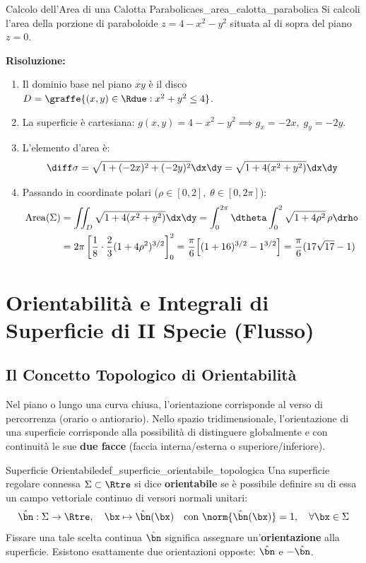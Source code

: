 \begin{esempio}{Calcolo dell'Area di una Calotta Parabolica}{es_area_calotta_parabolica}
Si calcoli l'area della porzione di paraboloide $z = 4 - x^2 - y^2$ situata al di sopra del piano $z = 0$.

\medskip\noindent\textbf{Risoluzione:}
\begin{enumerate}
    \item Il dominio base nel piano $xy$ è il disco $D = \graffe{(x,y) \in \Rdue : x^2 + y^2 \le 4}$.
    \item La superficie è cartesiana: $g(x,y) = 4 - x^2 - y^2 \implies g_x = -2x, \; g_y = -2y$.
    \item L'elemento d'area è:
    \[
    \diff\sigma = \sqrt{1 + (-2x)^2 + (-2y)^2} \dx\dy = \sqrt{1 + 4(x^2 + y^2)} \dx\dy
    \]
    \item Passando in coordinate polari ($\rho \in [0, 2], \; \theta \in [0, 2\pi]$):
    \begin{align*}
    \operatorname{Area}(\Sigma) &= \iint_D \sqrt{1 + 4(x^2+y^2)} \dx\dy = \int_0^{2\pi} \dtheta \int_0^2 \sqrt{1 + 4\rho^2} \, \rho \drho \\
    &= 2\pi \left[ \frac{1}{8} \cdot \frac{2}{3} (1 + 4\rho^2)^{3/2} \right]_0^2 = \frac{\pi}{6} \Big[ (1 + 16)^{3/2} - 1^{3/2} \Big] = \frac{\pi}{6} (17\sqrt{17} - 1)
    \end{align*}
\end{enumerate}
\end{esempio}

\section{Orientabilità e Integrali di Superficie di II Specie (Flusso)}

\subsection{Il Concetto Topologico di Orientabilità}

Nel piano o lungo una curva chiusa, l'orientazione corrisponde al verso di percorrenza (orario o antiorario). Nello spazio tridimensionale, l'orientazione di una superficie corrisponde alla possibilità di distinguere globalmente e con continuità le sue \textbf{due facce} (faccia interna/esterna o superiore/inferiore).

\begin{definizione}{Superficie Orientabile}{def_superficie_orientabile_topologica}
Una superficie regolare connessa $\Sigma \subset \Rtre$ si dice \textbf{orientabile} se è possibile definire su di essa un campo vettoriale continuo di versori normali unitari:
\[
\hat{\bn}: \Sigma \to \Rtre, \quad \bx \mapsto \hat{\bn}(\bx) \quad \text{con } \norm{\hat{\bn}(\bx)} = 1, \quad \forall \bx \in \Sigma
\]
Fissare una tale scelta continua $\hat{\bn}$ significa assegnare un'\textbf{orientazione} alla superficie. Esistono esattamente due orientazioni opposte: $\hat{\bn}$ e $-\hat{\bn}$.
\end{definizione}

